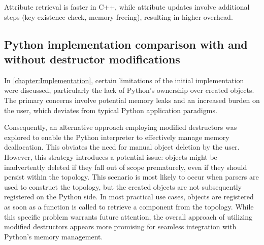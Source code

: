 Attribute retrieval is faster in C++, while attribute updates involve additional steps (key existence check, memory freeing), resulting in higher overhead.

\subsection{Python implementation comparison with and without destructor modifications}

In \autoref{chapter:Implementation}, certain limitations of the initial implementation were discussed, particularly the lack of Python's ownership over created objects. The primary concerns involve potential memory leaks and an increased burden on the user, which deviates from typical Python application paradigms.

Consequently, an alternative approach employing modified destructors was explored to enable the Python interpreter to effectively manage memory deallocation. This obviates the need for manual object deletion by the user. However, this strategy introduces a potential issue: objects might be inadvertently deleted if they fall out of scope prematurely, even if they should persist within the topology. This scenario is most likely to occur when parsers are used to construct the topology, but the created objects are not subsequently registered on the Python side. In most practical use cases, objects are registered as soon as a function is called to retrieve a component from the topology. While this specific problem warrants future attention, the overall approach of utilizing modified destructors appears more promising for seamless integration with Python's memory management.
